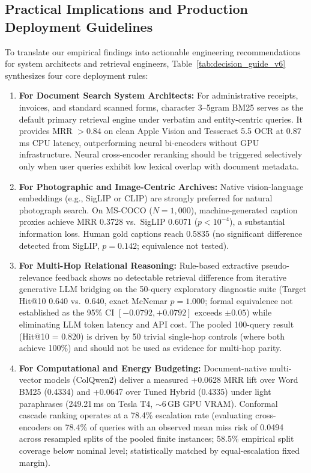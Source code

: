 \documentclass[conference]{IEEEtran}
\begin{document}
\subsection{Practical Implications and Production Deployment Guidelines}
\label{sec:practical_implications}
To translate our empirical findings into actionable engineering recommendations for system architects and retrieval engineers, Table~\ref{tab:decision_guide_v6} synthesizes four core deployment rules:
\begin{enumerate}
    \setlength{\itemsep}{1pt plus 0.5pt}
    \setlength{\parskip}{0pt}
    \item \textbf{For Document Search System Architects:} For administrative receipts, invoices, and standard scanned forms, character 3--5gram BM25 serves as the default primary retrieval engine under verbatim and entity-centric queries. It provides MRR $> 0.84$ on clean Apple Vision and Tesseract 5.5 OCR at $0.87$\,ms CPU latency, outperforming neural bi-encoders without GPU infrastructure. Neural cross-encoder reranking should be triggered selectively only when user queries exhibit low lexical overlap with document metadata.
    \item \textbf{For Photographic and Image-Centric Archives:} Native vision-language embeddings (e.g., SigLIP or CLIP) are strongly preferred for natural photograph search. On MS-COCO ($N=1{,}000$), machine-generated caption proxies achieve MRR 0.3728 vs.\ SigLIP 0.6071 ($p < 10^{-4}$), a substantial information loss. Human gold captions reach 0.5835 (no significant difference detected from SigLIP, $p=0.142$; equivalence not tested).
    \item \textbf{For Multi-Hop Relational Reasoning:} Rule-based extractive pseudo-relevance feedback shows no detectable retrieval difference from iterative generative LLM bridging on the 50-query exploratory diagnostic suite (Target Hit@10 0.640 vs.\ 0.640, exact McNemar $p=1.000$; formal equivalence not established as the 95\% CI $[-0.0792, +0.0792]$ exceeds $\pm 0.05$) while eliminating LLM token latency and API cost. The pooled 100-query result (Hit@10 = 0.820) is driven by 50 trivial single-hop controls (where both achieve 100\%) and should not be used as evidence for multi-hop parity.
    \item \textbf{For Computational and Energy Budgeting:} Document-native multi-vector models (ColQwen2) deliver a measured +0.0628 MRR lift over Word BM25 (0.4334) and +0.0647 over Tuned Hybrid (0.4335) under light paraphrases (249.21\,ms on Tesla T4, $\sim$6\,GB GPU VRAM). Conformal cascade ranking operates at a 78.4\% escalation rate (evaluating cross-encoders on 78.4\% of queries with an observed mean miss risk of 0.0494 across resampled splits of the pooled finite instances; 58.5\% empirical split coverage below nominal level; statistically matched by equal-escalation fixed margin).
\end{enumerate}
\end{document}

